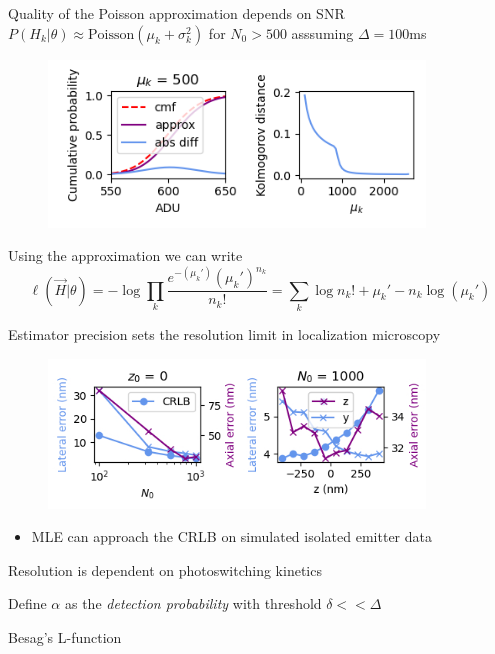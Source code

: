 \documentclass{beamer}					%
\begin{document}
\begin{frame}{Quality of the Poisson approximation depends on SNR}
$P(H_{k}|\theta)\approx \mathrm{Poisson}(\mu_{k}+\sigma_{k}^{2})$ for $N_{0} > 500$ asssuming $\Delta=100$ms 
\begin{figure}
\includegraphics[width=10cm]{Kolmogorov.png}
\end{figure}
Using the approximation we can write
\begin{equation*}
\ell(\vec{H}|\theta) = -\log \prod_{k} \frac{e^{-\left(\mu_{k}'\right)}\left(\mu_{k}'\right)^{n_{k}}}{n_{k}!} = \sum_{k}  \log n_{k}! + \mu_{k}' - n_{k}\log\left(\mu_{k}'\right)
\end{equation*}

\end{frame}

\begin{frame}{Estimator precision sets the resolution limit in localization microscopy}
\begin{figure}
\includegraphics[width=10cm]{Errors.png}
\end{figure}
\begin{itemize}
\item MLE can approach the CRLB on simulated isolated emitter data
\end{itemize}
\end{frame}

\begin{frame}{Resolution is dependent on photoswitching kinetics}

Define $\alpha$ as the \emph{detection probability} with threshold $\delta << \Delta$

Besag's L-function

\end{frame}
\end{document}
